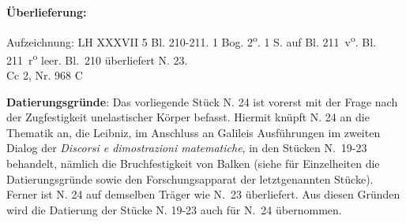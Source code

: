 \begin{ledgroupsized}[r]{120mm}
\footnotesize
\pstart
\noindent\textbf{\"{U}berlieferung:}
\pend
\end{ledgroupsized}
\begin{ledgroupsized}[r]{114mm}
\footnotesize
\pstart \parindent -6mm
%
Aufzeichnung: LH XXXVII 5 Bl. 210-211.
1 Bog. 2\textsuperscript{o}.
1 S. auf Bl. 211~v\textsuperscript{o}.
Bl. 211~r\textsuperscript{o} leer.
Bl.~210 überliefert N. 23.%
\\
Cc 2, Nr. 968 C
\pend
\end{ledgroupsized}
%
\vspace*{4mm}
\begin{ledgroup}
\footnotesize
\pstart
\noindent\footnotesize{\textbf{Datierungsgr\"{u}nde}:
Das vorliegende Stück N. 24 %
ist vorerst mit der Frage nach der Zugfestigkeit un\-elas\-tischer Körper befasst.
Hiermit knüpft N. 24 an die Thematik an,
die Leibniz, im Anschluss an Galileis\protect{}
Ausführungen im zweiten Dialog der \textit{Discorsi e dimostrazioni matematiche},
in den Stücken N.~19-23 %
behandelt,
nämlich die Bruchfestigkeit von Balken
(siehe für Einzelheiten die Datierungsgründe sowie den Forschungsapparat der letztgenannten Stücke).
Ferner ist N. 24 %
auf demselben Träger wie N.~23 %
überliefert.
Aus diesen Gründen wird die Datierung der Stücke N. 19-23 %
auch für N.~24 %
übernommen.}
\pend
\end{ledgroup}
%
\vspace*{6mm}%
\normalsize
\count{}
\count{}
\count{}
\pstart%
\noindent%
